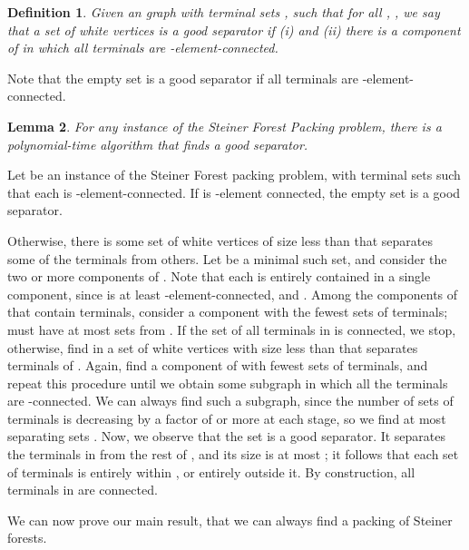 \documentclass[11pt]{article}
\newtheorem{lemma}{Lemma}[section]
\newtheorem{definition}[lemma]{Definition}
\renewenvironment{proof}{\vspace{-0.1in}\noindent{\bf Proof:}}{\hspace*{\fill}\par}
\begin{document}
\begin{definition}
  Given an graph  with terminal sets ,
  such that for all , , we say that a set 
  of white vertices is a \emph{good separator} if (i) 
  and (ii) there is a component of  in which all terminals are
  -element-connected.
\end{definition}

Note that the empty set is a good separator if all terminals are -element-connected. 

\begin{lemma}\label{lem:separator}
  For any instance of the Steiner Forest Packing problem, there is a
  polynomial-time algorithm that finds a good separator.
\end{lemma}
\begin{proof}
  Let  be an instance of the Steiner Forest packing problem,
  with terminal sets  such that each  is
  -element-connected.  If  is -element
  connected, the empty set  is a good separator.

  Otherwise, there is some set of white vertices of size less than
   that separates some of the terminals from
  others. Let  be a minimal such set, and consider the two or
  more components of . Note that each  is entirely
  contained in a single component, since  is at least
  -element-connected, and . Among the components of
   that contain terminals, consider a component  with the
  fewest sets of terminals;  must have at most  sets from
  . If the set of all terminals in  is
   connected, we stop, otherwise, find in  a
  set of white vertices  with size less than 
  that separates terminals of .  Again, find a component  of
   with fewest sets of terminals, and repeat this procedure
  until we obtain some subgraph  in which all the terminals
  are -connected.  We can always find such a
  subgraph, since the number of sets of terminals is decreasing by a
  factor of  or more at each stage, so we find at most 
  separating sets .  Now, we observe that the set  is a good separator. It separates the terminals
  in  from the rest of , and its size is at most ; it follows that each set of
  terminals  is entirely within , or entirely outside
  it. By construction, all terminals in  are  connected.
\end{proof}


We can now prove our main result, that we can always find a packing of
 Steiner forests.
\end{document}
